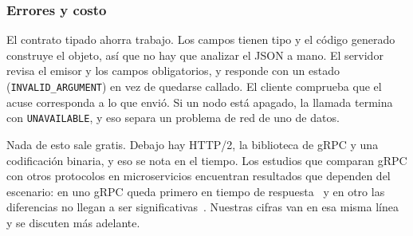 \subsubsection{Errores y costo}

El contrato tipado ahorra trabajo. Los campos tienen tipo y el código generado
construye el objeto, así que no hay que analizar el JSON a mano. El servidor
revisa el emisor y los campos obligatorios, y responde con un estado
(\texttt{INVALID\_ARGUMENT}) en vez de quedarse callado. El cliente comprueba que
el acuse corresponda a lo que envió. Si un nodo está apagado, la llamada termina
con \texttt{UNAVAILABLE}, y eso separa un problema de red de uno de datos.

Nada de esto sale gratis. Debajo hay HTTP/2, la biblioteca de gRPC y una
codificación binaria, y eso se nota en el tiempo. Los estudios que comparan gRPC
con otros protocolos en microservicios encuentran resultados que dependen del
escenario: en uno gRPC queda primero en tiempo de respuesta~\cite{niswar2024microservices}
y en otro las diferencias no llegan a ser significativas~\cite{ain2025grpc}.
Nuestras cifras van en esa misma línea y se discuten más adelante.
